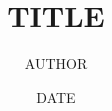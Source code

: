 \documentclass[10pt,a4paper]{article}
\begin{document}
\title{{{TITLE}}}
\date{{{DATE}}}
\author{{{AUTHOR}}}
\maketitle
    
\thispagestyle{plain}
\setcounter{page}{1}
\linenumbers
\end{document}
